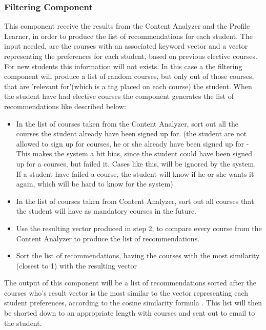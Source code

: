 \subsubsection{Filtering Component}
This component receive the results from the Content Analyzer and the Profile Learner, in order to produce the list of recommendations for each student. The input needed, are the courses with an associated keyword vector and a vector representing the preferences for each student, based on previous elective courses. For new students this information will not exists. In this case a the filtering component will produce a list of random courses, but only out of those courses, that are 'relevant for'(which is a tag placed on each course) the student. When the student have had elective courses the component generates the list of recommendations like described below:
\begin{itemize}
	\item In the list of courses taken from the Content Analyzer, sort out all the courses the student already have been signed up for. (the student are not allowed to sign up for courses, he or she already have been signed up for - This makes the system a bit bias, since the student could have been signed up for a courses, but failed it. Cases like this, will be ignored by the system. If a student have failed a course, the student will know if he or she wants it again, which will be hard to know for the system)
	\item In the list of courses taken from Content Analyzer, sort out all courses that the student will have as mandatory courses in the future.
	\item Use the resulting vector produced in step 2, to compare every course from the Content Analyzer to produce the list of recommendations.
	\item Sort the list of recommendations, having the courses with the most similarity (closest to 1) with the resulting vector 
\end{itemize}
The output of this component will be a list of recommendations sorted after the courses who's result vector is the most similar to the vector representing each student preferences, according to the cosine similarity formula . This list will then be shorted down to an appropriate length with courses and sent out to email to the student. 


